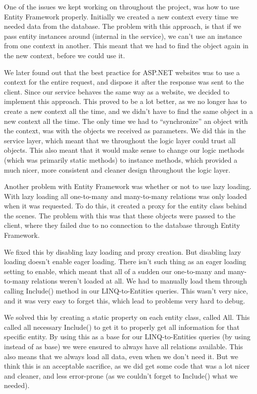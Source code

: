 One of the issues we kept working on throughout the project, was how to use Entity Framework properly. Initially we created a new context every time we needed data from the database. The problem with this approach, is that if we pass entity instances around (internal in the service), we can't use an instance from one context in another. This meant that we had to find the object again in the new context, before we could use it.

We later found out that the best practice for ASP.NET websites was to use a context for the entire request, and dispose it after the response was sent to the client. Since our service behaves the same way as a website, we decided to implement this approach. This proved to be a lot better, as we no longer has to create a new context all the time, and we didn't have to find the same object in a new context all the time. The only time we had to ``synchronize'' an object with the context, was with the objects we received as parameters. We did this in the service layer, which meant that we throughout the logic layer could trust all objects. This also meant that it would make sense to change our logic methods (which was primarily static methods) to instance methods, which provided a much nicer, more consistent and cleaner design throughout the logic layer.

Another problem with Entity Framework was whether or not to use lazy loading. With lazy loading all one-to-many and many-to-many relations was only loaded when it was requested. To do this, it created a proxy for the entity class behind the scenes. The problem with this was that these objects were passed to the client, where they failed due to no connection to the database through Entity Framework.

We fixed this by disabling lazy loading and proxy creation. But disabling lazy loading doesn't enable eager loading. There isn't such thing as an eager loading setting to enable, which meant that all of a sudden our one-to-many and many-to-many relations weren't loaded at all. We had to manually load them through calling Include() method in our LINQ-to-Entities queries. This wasn't very nice, and it was very easy to forget this, which lead to problems very hard to debug.

We solved this by creating a static property on each entity class, called All. This called all necessary Include() to get it to properly get all information for that specific entity. By using this as a base for our LINQ-to-Entities queries (by using  instead of  as base) we were ensured to always have all relations available. This also means that we always load all data, even when we don't need it. But we think this is an acceptable sacrifice, as we did get some code that was a lot nicer and cleaner, and less error-prone (as we couldn't forget to Include() what we needed).

